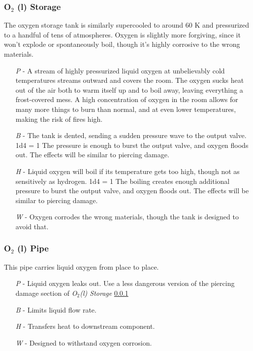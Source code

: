 \documentclass[a4paper]{article}
\begin{document}
\vspace{-0.5cm} \hspace{-18pt} \subsubsection{O$_2$ (l) Storage} \label{engine_o2_storage} \vspace{-0.2cm}
The oxygen storage tank is similarly supercooled to around 60 K and pressurized to a handful of tens of atmospheres. Oxygen is slightly more forgiving, since it won't explode or spontaneously boil, though it's highly corrosive to the wrong materials.
\begin{enumerate}
\item [\textit{P}] - A stream of highly pressurized liquid oxygen at unbelievably cold temperatures streams outward and covers the room. The oxygen sucks heat out of the air both to warm itself up and to boil away, leaving everything a frost-covered mess. A high concentration of oxygen in the room allows for many more things to burn than normal, and at even lower temperatures, making the risk of fires high.
\item [\textit{B}] - The tank is dented, sending a sudden pressure wave to the output valve. \newline \hspace*{3pt} 1d4 = 1 The pressure is enough to burst the output valve, and oxygen floods out. The effects will be similar to piercing damage.
\item [\textit{H}] - Liquid oxygen will boil if its temperature gets too high, though not as sensitively as hydrogen. \newline \hspace*{3pt} 1d4 = 1 The boiling creates enough additional pressure to burst the output valve, and oxygen floods out. The effects will be similar to piercing damage.
\item [\textit{W}] - Oxygen corrodes the wrong materials, though the tank is designed to avoid that. 
\end{enumerate}

\vspace{-0.5cm} \hspace{-18pt} \subsubsection{O$_2$ (l) Pipe} \label{engine_o2_pipe} \vspace{-0.2cm}
This pipe carries liquid oxygen from place to place. 
\begin{enumerate}
\item [\textit{P}] - Liquid oxygen leaks out. Use a less dangerous version of the piercing damage section of \textit{O$_2$(l) Storage} \ref{engine_o2_storage}
\item [\textit{B}] - Limits liquid flow rate.
\item [\textit{H}] - Transfers heat to downstream component.
\item [\textit{W}] - Designed to withstand oxygen corrosion.
\end{enumerate}
\end{document}
